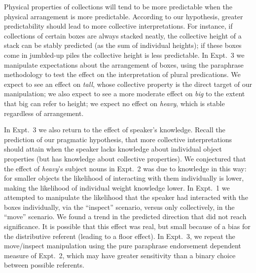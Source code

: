 \documentclass[preprint,12pt,authoryear,titlepage]{elsarticle}
\begin{document}

Physical properties of collections will tend to be more predictable when the physical arrangement is more predictable. 
According to our hypothesis, greater predictability should lead to more collective interpretations.
For instance, if collections of certain boxes are always stacked neatly, the collective height of a stack can be stably predicted (as the sum of individual heights); if these boxes come in jumbled-up piles the collective height is less predictable.
In Expt.~3 we manipulate expectations about the arrangement of boxes, using the paraphrase methodology to test the effect on the interpretation of plural predications. We expect to see an effect on \emph{tall}, whose collective property is the direct target of our manipulation; we also expect to see a more moderate effect on \emph{big} to the extent that big can refer to height; we expect no effect on \emph{heavy}, which is stable regardless of arrangement.

In Expt.~3 we also return to the effect of speaker's knowledge. Recall the prediction of our pragmatic hypothesis, that more collective interpretations should attain when the speaker lacks knowledge about individual object properties (but has knowledge about collective properties). We conjectured that the effect of \emph{heavy}'s subject nouns in Expt.~2 was due to knowledge in this way: for smaller objects the likelihood of interacting with them individually is lower, making the likelihood of individual weight knowledge lower.
In Expt.~1 we attempted to manipulate the likelihood that the speaker had interacted with the boxes individually, via the ``inspect'' scenario, versus only collectively, in the ``move'' scenario. We found a trend in the predicted direction that did not reach significance.
It is possible that this effect was real, but small because of a bias for the distributive referent (leading to a floor effect).
In Expt.~3, we repeat the move/inspect manipulation using the pure paraphrase endorsement dependent measure of Expt.~2, which may have greater sensitivity than a binary choice between possible referents.
\end{document}
